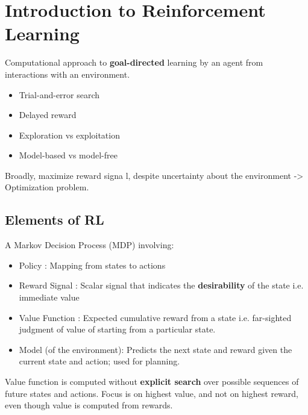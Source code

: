 \section{Introduction to Reinforcement Learning}


Computational approach to \textbf{goal-directed} learning by an agent from interactions with an environment.
\begin{itemize}
    \item Trial-and-error search
    \item Delayed reward
    \item Exploration vs exploitation
    \item Model-based vs model-free
\end{itemize}

Broadly, maximize reward signa  l, despite uncertainty about the environment -> Optimization problem.

\subsection{Elements of RL}
A Markov Decision Process (MDP) involving:
\begin{itemize}
    \item Policy : Mapping from states to actions
    \item Reward Signal : Scalar signal that indicates the \textbf{desirability} of the state i.e. immediate value
    \item Value Function : Expected cumulative reward from a state i.e. far-sighted judgment of value of starting from a particular state.
    \item Model (of the environment): Predicts the next state and reward given the current state and action; used for planning.
\end{itemize}

Value function is computed without \textbf{explicit search} over possible sequences of future states and actions. 
Focus is on highest value, and not on highest reward, even though value is computed from rewards.
